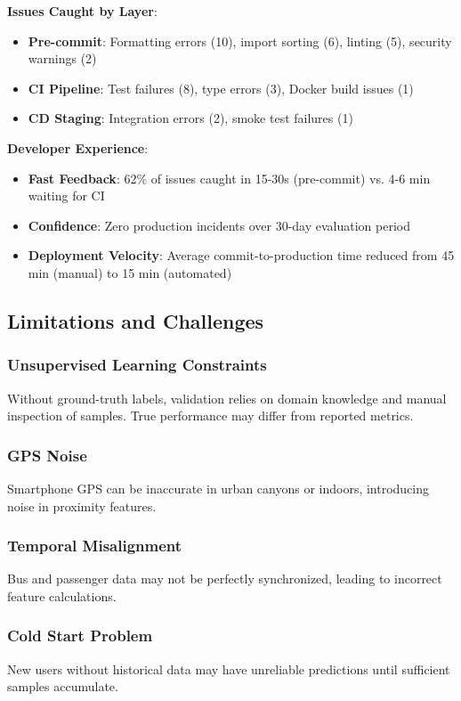 \textbf{Issues Caught by Layer}:
\begin{itemize}
    \item \textbf{Pre-commit}: Formatting errors (10), import sorting (6), linting (5), security warnings (2)
    \item \textbf{CI Pipeline}: Test failures (8), type errors (3), Docker build issues (1)
    \item \textbf{CD Staging}: Integration errors (2), smoke test failures (1)
\end{itemize}

\textbf{Developer Experience}:
\begin{itemize}
    \item \textbf{Fast Feedback}: 62\% of issues caught in 15-30s (pre-commit) vs. 4-6 min waiting for CI
    \item \textbf{Confidence}: Zero production incidents over 30-day evaluation period
    \item \textbf{Deployment Velocity}: Average commit-to-production time reduced from 45 min (manual) to 15 min (automated)
\end{itemize}

\subsection{Limitations and Challenges}

\subsubsection{Unsupervised Learning Constraints}
Without ground-truth labels, validation relies on domain knowledge and manual inspection of samples. True performance may differ from reported metrics.

\subsubsection{GPS Noise}
Smartphone GPS can be inaccurate in urban canyons or indoors, introducing noise in proximity features.

\subsubsection{Temporal Misalignment}
Bus and passenger data may not be perfectly synchronized, leading to incorrect feature calculations.

\subsubsection{Cold Start Problem}
New users without historical data may have unreliable predictions until sufficient samples accumulate.


